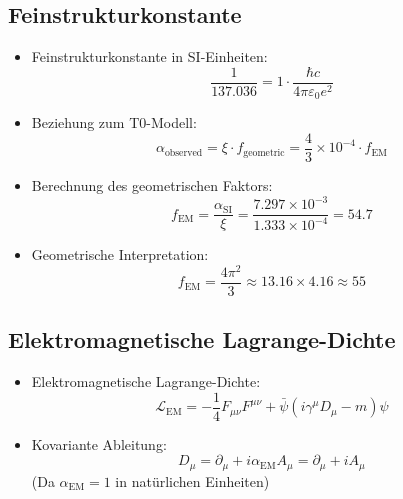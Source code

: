 \documentclass[12pt,a4paper]{article}
\begin{document}
	\subsection{Feinstrukturkonstante}
	\begin{itemize}
		\item Feinstrukturkonstante in SI-Einheiten:
		\begin{equation}
			\frac{1}{137.036} = 1 \cdot \frac{\hbar c}{4\pi\varepsilon_0 e^2}
		\end{equation}
		
		\item Beziehung zum T0-Modell:
		\begin{equation}
			\alpha_{\text{observed}} = \xi \cdot f_{\text{geometric}} = \frac{4}{3} \times 10^{-4} \cdot f_{\text{EM}}
		\end{equation}
		
		\item Berechnung des geometrischen Faktors:
		\begin{equation}
			f_{\text{EM}} = \frac{\alpha_{\text{SI}}}{\xi} = \frac{7.297 \times 10^{-3}}{1.333 \times 10^{-4}} = 54.7
		\end{equation}
		
		\item Geometrische Interpretation:
		\begin{equation}
			f_{\text{EM}} = \frac{4\pi^2}{3} \approx 13.16 \times 4.16 \approx 55
		\end{equation}
	\end{itemize}
	
	\subsection{Elektromagnetische Lagrange-Dichte}
	\begin{itemize}
		\item Elektromagnetische Lagrange-Dichte:
		\begin{equation}
			\mathcal{L}_{\text{EM}} = -\frac{1}{4}F_{\mu\nu}F^{\mu\nu} + \bar{\psi}(i\gamma^\mu D_\mu - m)\psi
		\end{equation}
		
		\item Kovariante Ableitung:
		\begin{equation}
			D_\mu = \partial_\mu + i \alpha_{\text{EM}} A_\mu = \partial_\mu + i A_\mu
		\end{equation}
		(Da $\alpha_{\text{EM}} = 1$ in natürlichen Einheiten)
	\end{itemize}
	
\end{document}
